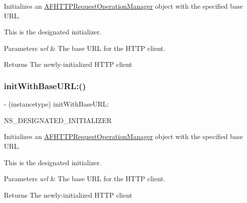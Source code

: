 Initializes an {\ttfamily \mbox{\hyperlink{interface_a_f_h_t_t_p_request_operation_manager}{A\+F\+H\+T\+T\+P\+Request\+Operation\+Manager}}} object with the specified base U\+RL.

This is the designated initializer.


\begin{DoxyParams}{Parameters}
{\em url} & The base U\+RL for the H\+T\+TP client.\\
\hline
\end{DoxyParams}
\begin{DoxyReturn}{Returns}
The newly-\/initialized H\+T\+TP client 
\end{DoxyReturn}
\mbox{\label{interface_a_f_h_t_t_p_request_operation_manager_ac9f2ccf8cfa05afbff8ad4fd2a900190}} 
\subsubsection{\texorpdfstring{init\+With\+Base\+U\+R\+L\+:()}{initWithBaseURL:()}\hspace{0.1cm}{\footnotesize\ttfamily [3/3]}}
{\footnotesize\ttfamily -\/ (instancetype) init\+With\+Base\+U\+R\+L\+: \begin{DoxyParamCaption}\item[{(nullable N\+S\+U\+RL $\ast$)}]{N\+S\+\_\+\+D\+E\+S\+I\+G\+N\+A\+T\+E\+D\+\_\+\+I\+N\+I\+T\+I\+A\+L\+I\+Z\+ER }\end{DoxyParamCaption}}

Initializes an {\ttfamily \mbox{\hyperlink{interface_a_f_h_t_t_p_request_operation_manager}{A\+F\+H\+T\+T\+P\+Request\+Operation\+Manager}}} object with the specified base U\+RL.

This is the designated initializer.


\begin{DoxyParams}{Parameters}
{\em url} & The base U\+RL for the H\+T\+TP client.\\
\hline
\end{DoxyParams}
\begin{DoxyReturn}{Returns}
The newly-\/initialized H\+T\+TP client 
\end{DoxyReturn}
\mbox{\label{interface_a_f_h_t_t_p_request_operation_manager_a754dc33037c729c5ef6a34b12de6884a}} 
